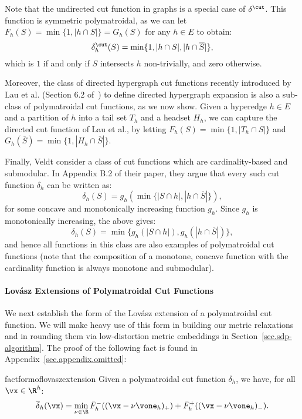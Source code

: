 \documentclass[letterpaper]{article}
\begin{document}
Note that the undirected cut function in graphs is a special case of $\delta^\cut$. This function is symmetric polymatroidal, as we can let $F_h (S) = \min\{1, |h\cap S|\} = G_h(S)$ for any $h\in E$ to obtain:
\[
    \delta_h^{\cut}(S) = \min\{1, |h\cap S|, |h\cap \overline{S}|\},
\]
which is $1$ if and only if $S$ intersects $h$ non-trivially, and zero otherwise.

Moreover, the class of directed hypergraph cut functions recently introduced by Lau et al. (Section 6.2 of~\cite{lau2023fast}) to define directed hypergraph expansion is also a sub-class of polymatroidal cut functions, as we now show. Given a hyperedge $h\in E$ and a partition of $h$ into a tail set $T_h$ and a headset $H_h$, we can capture the directed cut function of Lau et al., by letting $F_h(S)= \min \{1,|T_h\cap S|\}$ and $G_h(\overline{S}) = \min \{1,|H_h\cap \overline{S}|\}$.

Finally, Veldt \etal \cite{veldt2021approximate} consider a class of cut functions which are cardinality-based and submodular. In Appendix B.2 of their paper, they argue that every such cut function $\delta_h$ can be written as:
\[
    \delta_h(S) = g_h(\min\{|S \cap h|, |h\cap \overline{S}|\}),
\]
for some concave and monotonically increasing function $g_h$. Since $g_h$ is monotonically increasing, the above gives:
\[
    \delta_h(S) = \min\{g_h(|S \cap h|), g_h(|h\cap \overline{S}|)\},
\]
and hence all functions in this class are also examples of polymatroidal cut functions (note that the composition of a monotone, concave function with the cardinality function is always monotone and submodular).

\paragraph{Lov\'asz Extensions of Polymatroidal Cut Functions}
We next establish the form of the Lov\'{a}sz extension of a polymatroidal cut function. We will make heavy use of this form in building our metric relaxations and in rounding them via low-distortion metric embeddings in Section~\ref{sec.sdp-algorithm}.
The proof of the following fact is found in Appendix~\ref{sec.appendix.omitted}:

\begin{restatable}{fact}{formoflovaszextension}
\label{fact.form-of-lovasz-extension}
    Given a polymatroidal cut function $\delta_h$, we have, for all $\vx \in \R^h$:
    \[
        \overline{\delta}_h(\vx) = \min_{\nu \in \R}\bar{F}^-_h((\vx - \nu \vone_h)_+ ) + \bar{F}^+_h((\vx - \nu \vone_h)_-).
    \]
\end{restatable}
\end{document}
